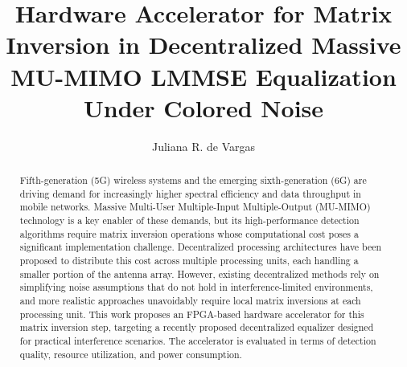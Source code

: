 \documentclass[12pt]{article}
\title{Hardware Accelerator for Matrix Inversion in Decentralized Massive MU-MIMO LMMSE Equalization Under Colored Noise}
\author{Juliana R. de Vargas\inst{1}}
\begin{document}
 
\maketitle

\begin{abstract}

Fifth-generation (5G) wireless systems and the emerging sixth-generation
(6G) are driving demand for increasingly higher spectral efficiency and
data throughput in mobile networks. Massive Multi-User Multiple-Input
Multiple-Output (MU-MIMO) technology is a key enabler of these demands,
but its high-performance detection algorithms require matrix inversion
operations whose computational cost poses a significant implementation
challenge. Decentralized processing architectures have been proposed to
distribute this cost across multiple processing units, each handling a
smaller portion of the antenna array. However, existing decentralized
methods rely on simplifying noise assumptions that do not hold in
interference-limited environments, and more realistic approaches
unavoidably require local matrix inversions at each processing unit.
This work proposes an FPGA-based hardware accelerator for this matrix
inversion step, targeting a recently proposed decentralized equalizer
designed for practical interference scenarios. The accelerator is
evaluated in terms of detection quality, resource utilization, and
power consumption.
\end{abstract}

\end{document}
